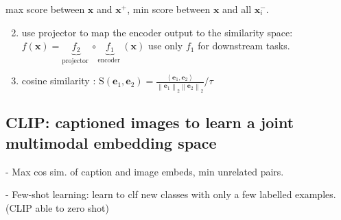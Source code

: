 max score between $\mathbf{x}$ and $\mathbf{x}^{+}$, min score between $\mathbf{x}$ and all $\mathbf{x}_{i}^{-}$.

\begin{enumerate}
  \setcounter{enumi}{1}
  \item use projector to map the encoder output to the similarity space:
  $
  f(\mathbf{x})=\underbrace{f_{2}}_{\text {projector }} \circ \underbrace{f_{1}}_{\text {encoder }}(\mathbf{x})
  $
  use only $f_{1}$ for downstream tasks.
\end{enumerate}


\begin{enumerate}
  \setcounter{enumi}{2}
  \item cosine similarity :
  $
  \mathrm{S}\left(\mathbf{e}_{1}, \mathbf{e}_{2}\right)=\frac{\left\langle\mathbf{e}_{1}, \mathbf{e}_{2}\right\rangle}{\left\|\mathbf{e}_{1}\right\|_{2}\left\|\mathbf{e}_{2}\right\|_{2}} / \tau
  $
\end{enumerate}








\subsection*{CLIP: captioned images to learn a joint multimodal embedding space}

- Max cos sim. of caption and image embeds, min unrelated pairs.

- Few-shot learning: learn to clf new classes with only a few labelled examples. (CLIP able to zero shot)

